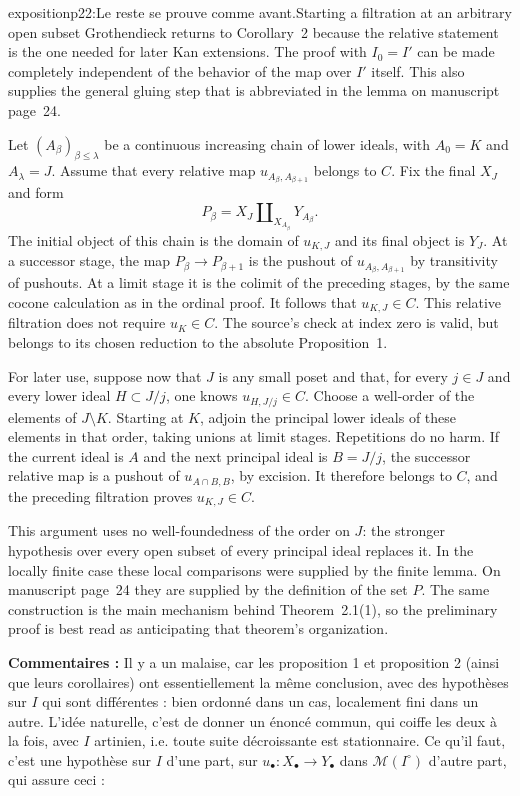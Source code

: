 \begin{dcomment}{exposition}{p22:Le reste se prouve comme avant.}{Starting a filtration at an arbitrary open subset}
Grothendieck returns to Corollary~2 because the relative statement is the one needed for later Kan extensions. The proof with $I_0=I'$ can be made completely independent of the behavior of the map over $I'$ itself. This also supplies the general gluing step that is abbreviated in the lemma on manuscript page~24.

Let $(A_\beta)_{\beta\leq\lambda}$ be a continuous increasing chain of lower ideals, with $A_0=K$ and $A_\lambda=J$. Assume that every relative map $u_{A_\beta,A_{\beta+1}}$ belongs to $C$. Fix the final $X_J$ and form
\[
 P_\beta=X_J\amalg_{X_{A_\beta}}Y_{A_\beta}.
\]
The initial object of this chain is the domain of $u_{K,J}$ and its final object is $Y_J$. At a successor stage, the map $P_\beta\to P_{\beta+1}$ is the pushout of $u_{A_\beta,A_{\beta+1}}$ by transitivity of pushouts. At a limit stage it is the colimit of the preceding stages, by the same cocone calculation as in the ordinal proof. It follows that $u_{K,J}\in C$. This relative filtration does not require $u_K\in C$. The source's check at index zero is valid, but belongs to its chosen reduction to the absolute Proposition~1.

For later use, suppose now that $J$ is any small poset and that, for every $j\in J$ and every lower ideal $H\subset J/j$, one knows $u_{H,J/j}\in C$. Choose a well-order of the elements of $J\setminus K$. Starting at $K$, adjoin the principal lower ideals of these elements in that order, taking unions at limit stages. Repetitions do no harm. If the current ideal is $A$ and the next principal ideal is $B=J/j$, the successor relative map is a pushout of $u_{A\cap B,B}$, by excision. It therefore belongs to $C$, and the preceding filtration proves $u_{K,J}\in C$.

This argument uses no well-foundedness of the order on $J$: the stronger hypothesis over every open subset of every principal ideal replaces it. In the locally finite case these local comparisons were supplied by the finite lemma. On manuscript page~24 they are supplied by the definition of the set $P$. The same construction is the main mechanism behind Theorem~2.1(1), so the preliminary proof is best read as anticipating that theorem's organization.
\end{dcomment}


\textbf{Commentaires :} Il y a un malaise, car les proposition 1 et proposition 2 (ainsi que leurs corollaires) ont essentiellement la même conclusion, avec des hypothèses sur $I$ qui sont  différentes : bien ordonné dans un cas, localement fini dans un autre. L'idée naturelle, c'est de donner un énoncé commun, qui coiffe les deux à la fois, avec $I$ artinien, i.e. toute suite décroissante est stationnaire. Ce qu'il faut, c'est une hypothèse sur $I$ d'une part, sur $u_\bullet : X_\bullet \longrightarrow Y_\bullet$ dans $\mathcal{M}(I^\circ)$ d'autre part, qui assure ceci :

